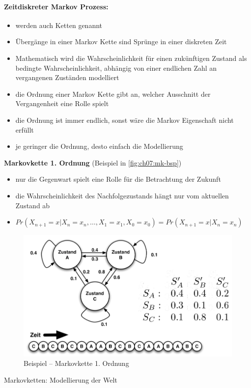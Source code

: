 \paragraph{Zeitdiskreter Markov Prozess:}
\begin{itemize}
\item werden auch Ketten genannt
\item \"Uberg\"ange in einer Markov Kette sind Spr\"unge in einer diskreten Zeit
\item Mathematisch wird die Wahrscheinlichkeit f\"ur einen zuk\"unftigen Zustand als bedingte Wahrscheinlichkeit, abh\"angig von einer endlichen Zahl an vergangenen Zust\"anden modelliert
\item die Ordnung einer Markov Kette gibt an, welcher Ausschnitt der Vergangenheit eine Rolle spielt
\item die Ordnung ist immer endlich, sonst w\"are die Markov Eigenschaft nicht erf\"ullt
\item je geringer die Ordnung, desto einfach die Modellierung
\end{itemize}
\newpage
\textbf{Markovkette 1. Ordnung} (Beispiel in \autoref{fig:ch07:mk-bsp})
\begin{itemize}
\item nur die Gegenwart spielt eine Rolle f\"ur die Betrachtung der Zukunft
\item die Wahrscheinlichkeit des Nachfolgezustands h\"angt nur vom aktuellen Zustand ab
\item $Pr(X_{n+1} = x | X_n = x_n, \ldots, X_1 = x_1, X_0 = x_0) = Pr(X_{n+1} = x|X_n = x_n)$
\end{itemize}
\begin{figure}
	\centering
  	\includegraphics[width=0.5\linewidth]{figures/ch07_mk-bsp.png}
	\caption{Beispiel -- Markovkette 1. Ordnung}
	\label{fig:ch07:mk-bsp}
\end{figure}
Markovketten: Modellierung der Welt
